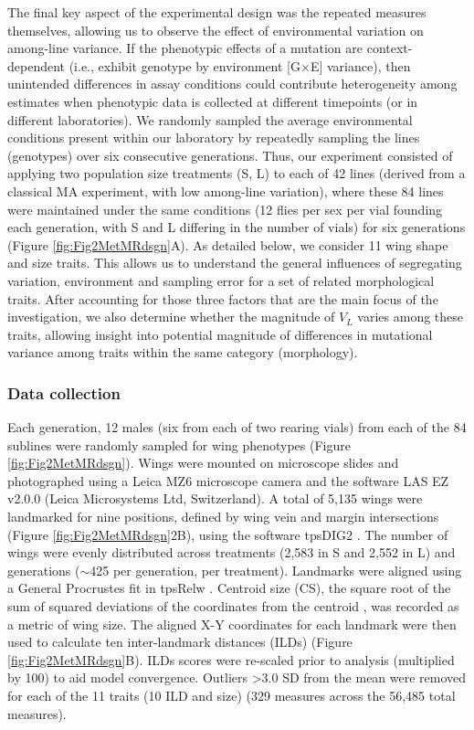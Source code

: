 The final key aspect of the experimental design was the repeated measures themselves, allowing us to observe the effect of environmental variation on among-line variance. If the phenotypic effects of a mutation are context-dependent (i.e., exhibit genotype by environment [G$\times$E] variance), then unintended differences in assay conditions could contribute heterogeneity among estimates when phenotypic data is collected at different timepoints (or in different laboratories). We randomly sampled the average environmental conditions present within our laboratory by repeatedly sampling the lines (genotypes) over six consecutive generations. Thus, our experiment consisted of applying two population size treatments (S, L) to each of 42 lines (derived from a classical MA experiment, with low among-line variation), where these 84 lines were maintained under the same conditions (12 flies per sex per vial founding each generation, with S and L differing in the number of vials) for six generations (Figure \ref{fig:Fig2MetMRdsgn}A). As detailed below, we consider 11 wing shape and size traits. This allows us to understand the general influences of segregating variation, environment and sampling error for a set of related morphological traits. After accounting for those three factors that are the main focus of the investigation, we also determine whether the magnitude of $V_L$ varies among these traits, allowing insight into potential magnitude of differences in mutational variance among traits within the same category (morphology). \par

\subsubsection{Data collection} 
Each generation, 12 males (six from each of two rearing vials) from each of the 84 sublines were randomly sampled for wing phenotypes (Figure \ref{fig:Fig2MetMRdsgn}). Wings were mounted on microscope slides and photographed using a Leica MZ6 microscope camera and the software LAS EZ v2.0.0 (Leica Microsystems Ltd, Switzerland). A total of 5,135 wings were landmarked for nine positions, defined by wing vein and margin intersections (Figure \ref{fig:Fig2MetMRdsgn}2B), using the software tpsDIG2 \citep{Rohl13}. The number of wings were evenly distributed across treatments (2,583 in S and 2,552 in L) and generations ($\sim$425 per generation, per treatment). Landmarks were aligned using a General Procrustes fit in tpsRelw \citep{Rohl07}. Centroid size (CS), the square root of the sum of squared deviations of the coordinates from the centroid \citep{Rohl99}, was recorded as a metric of wing size. The aligned X-Y coordinates for each landmark were then used to calculate ten inter-landmark distances (ILDs) (Figure \ref{fig:Fig2MetMRdsgn}B). ILDs scores were re-scaled prior to analysis (multiplied by 100) to aid model convergence. Outliers >3.0 SD from the mean were removed for each of the 11 traits (10 ILD and size) (329 measures across the 56,485 total measures).  \par

